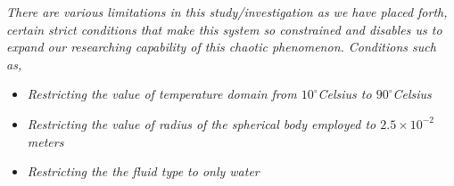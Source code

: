 \textit{There are various limitations in this study/investigation as we have placed forth, certain strict conditions that make this system so constrained and disables us to expand our researching capability of this chaotic phenomenon. Conditions such as,}
        
    \begin{itemize}
        \item \textit{Restricting the value of temperature domain from $10^\circ$Celsius to $90^\circ$Celsius}
        \item \textit{Restricting the value of radius of the spherical body employed to $2.5\times10^{-2}$ meters}
        \item \textit{Restricting the the fluid type to only water}
    \end{itemize}
        
        

